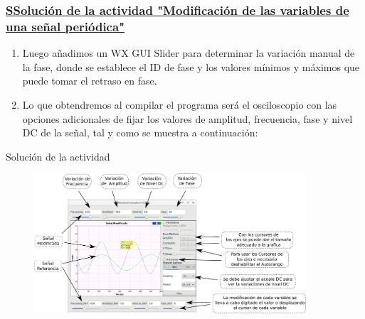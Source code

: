 	\begin{frame}
	\frametitle{\underline{\textbf{SSolución de la actividad "Modificación de las variables de una señal periódica"}}}
	\begin{enumerate}[2.]
	
	\item{Luego añadimos un WX GUI Slider para determinar la variación manual de la fase, donde se establece el ID de fase y los valores mínimos y máximos que puede tomar el retraso en fase.}\\
	\item{Lo que obtendremos al compilar el programa será el osciloscopio con las opciones adicionales de fijar los valores de amplitud, frecuencia, fase y nivel DC de la señal, tal y como se muestra a continuación:}\\
	
	\end{enumerate}
	\end{frame}


	\begin{frame}{Solución de la actividad}
	\begin{figure}[H]
		\vspace{-3mm}
		\centering
		\includegraphics[width=0.9\textwidth]{soluciones/actividad-1-2/pdf/Salida.pdf}
		\end{figure}
	\end{frame}
	
	

